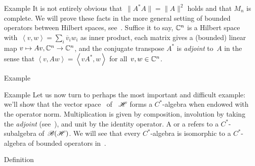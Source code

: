 \documentclass[a]{subfiles}
\begin{document}
\begin{parsec}
\begin{point}{Example}
It is not entirely obvious that~$\|A^*A\|=\|A\|^2$
holds
and that $M_n$ is complete.
We will prove these facts in the more general setting
of bounded operators between Hilbert spaces, 
see~.
Suffice it to say, $\mathbb{C}^n$ is a Hilbert space
with~$\left<v,w\right>=\sum_i \overline{v}_iw_i$
as inner product,
each matrix gives a (bounded) linear map $v\mapsto Av,\mathbb{C}^n\to \mathbb{C}^n$,
and the conjugate transpose $A^*$ is \emph{adjoint} to~$A$
in the sense that $\left<v,Aw\right> = \left<vA^*,w\right>$
for all~$v,w\in\mathbb{C}^n$.
\end{point}
\begin{point}{Example}%
\end{point}
\end{parsec}
\begin{parsec}[hilb]%
\begin{point}{Example}%
Let us now turn to perhaps the most important
and difficult example:
we'll show that the vector space~\Define{$\scrB(\scrH)$} 
of ~$\mathscr{H}$ forms a $C^*$-algebra
when endowed with the operator 
norm.
Multiplication is given by composition,
involution by taking the \emph{adjoint} (see~),
and unit by the identity operator.
A  or
a  
refers to a $C^*$-subalgebra of~$\scrB(\scrH)$.
We will see that every $C^*$-algebra is isomorphic to a $C^*$-algebra
of bounded operators in~.
\end{point}
\begin{point}{Definition}%


\end{point}
\end{parsec}
\end{document}
